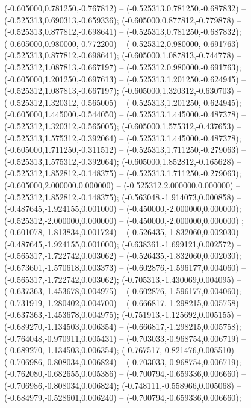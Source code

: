  (-0.605000,0.781250,-0.767812) -- (-0.525313,0.781250,-0.687832) -- (-0.525313,0.690313,-0.659336);
 (-0.605000,0.877812,-0.779878) -- (-0.525313,0.877812,-0.698641) -- (-0.525313,0.781250,-0.687832);
 (-0.605000,0.980000,-0.772200) -- (-0.525312,0.980000,-0.691763) -- (-0.525313,0.877812,-0.698641);
 (-0.605000,1.087813,-0.744778) -- (-0.525312,1.087813,-0.667197) -- (-0.525312,0.980000,-0.691763);
 (-0.605000,1.201250,-0.697613) -- (-0.525313,1.201250,-0.624945) -- (-0.525312,1.087813,-0.667197);
 (-0.605000,1.320312,-0.630703) -- (-0.525312,1.320312,-0.565005) -- (-0.525313,1.201250,-0.624945);
 (-0.605000,1.445000,-0.544050) -- (-0.525313,1.445000,-0.487378) -- (-0.525312,1.320312,-0.565005);
 (-0.605000,1.575312,-0.437653) -- (-0.525313,1.575312,-0.392064) -- (-0.525313,1.445000,-0.487378);
 (-0.605000,1.711250,-0.311512) -- (-0.525313,1.711250,-0.279063) -- (-0.525313,1.575312,-0.392064);
 (-0.605000,1.852812,-0.165628) -- (-0.525312,1.852812,-0.148375) -- (-0.525313,1.711250,-0.279063);
 (-0.605000,2.000000,0.000000) -- (-0.525312,2.000000,0.000000) -- (-0.525312,1.852812,-0.148375);
 (-0.563048,-1.914073,0.000858) -- (-0.487645,-1.924155,0.001000) -- (-0.450000,-2.000000,0.000000);
 (-0.525312,-2.000000,0.000000) -- (-0.450000,-2.000000,0.000000) ;
 (-0.601078,-1.813834,0.001724) -- (-0.526435,-1.832060,0.002030) -- (-0.487645,-1.924155,0.001000);
 (-0.638361,-1.699121,0.002572) -- (-0.565317,-1.722742,0.003062) -- (-0.526435,-1.832060,0.002030);
 (-0.673601,-1.570618,0.003373) -- (-0.602876,-1.596177,0.004060) -- (-0.565317,-1.722742,0.003062);
 (-0.705313,-1.430069,0.004095) -- (-0.637363,-1.453678,0.004975) -- (-0.602876,-1.596177,0.004060);
 (-0.731919,-1.280402,0.004700) -- (-0.666817,-1.298215,0.005758) -- (-0.637363,-1.453678,0.004975);
 (-0.751913,-1.125692,0.005155) -- (-0.689270,-1.134503,0.006354) -- (-0.666817,-1.298215,0.005758);
 (-0.764048,-0.970911,0.005431) -- (-0.703033,-0.968754,0.006719) -- (-0.689270,-1.134503,0.006354);
 (-0.767517,-0.821476,0.005510) -- (-0.706986,-0.808034,0.006824) -- (-0.703033,-0.968754,0.006719);
 (-0.762080,-0.682655,0.005386) -- (-0.700794,-0.659336,0.006660) -- (-0.706986,-0.808034,0.006824);
 (-0.748111,-0.558966,0.005068) -- (-0.684979,-0.528601,0.006240) -- (-0.700794,-0.659336,0.006660);
